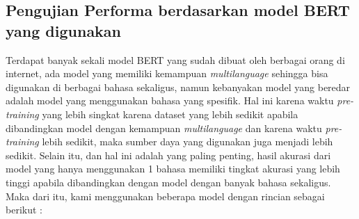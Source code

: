 \subsection{Pengujian Performa berdasarkan model BERT yang digunakan}

Terdapat banyak sekali model BERT yang sudah dibuat oleh berbagai orang di internet, ada model yang memiliki kemampuan \textit{multilanguage} sehingga bisa digunakan di berbagai bahasa sekaligus, namun kebanyakan model yang beredar adalah model yang menggunakan bahasa yang spesifik. Hal ini karena waktu \textit{pre-training} yang lebih singkat karena dataset yang lebih sedikit apabila dibandingkan model dengan kemampuan \textit{multilanguage} dan karena waktu \textit{pre-training} lebih sedikit, maka sumber daya yang digunakan juga menjadi lebih sedikit. Selain itu, dan hal ini adalah yang paling penting, hasil akurasi dari model yang hanya menggunakan 1 bahasa memiliki tingkat akurasi yang lebih tinggi apabila dibandingkan dengan model dengan banyak bahasa sekaligus. Maka dari itu, kami menggunakan beberapa model dengan rincian sebagai berikut :

